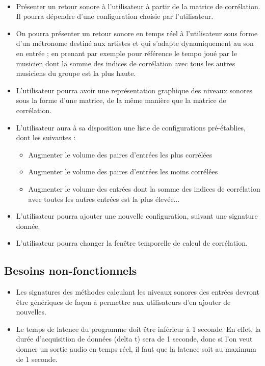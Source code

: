 \documentclass{article}
\begin{document}
    \paragraph{}
    \begin{itemize}
      \item Présenter un retour sonore à l'utilisateur à partir de la matrice de 
      corrélation. Il pourra dépendre d'une configuration choisie par l'utilisateur.
      \item On pourra présenter un retour sonore en temps réel à l'utilisateur sous
      forme d'un métronome destiné aux artistes et qui s'adapte dynamiquement au son
      en entrée ; en prenant par exemple pour référence le tempo joué par le musicien
      dont la somme des indices de corrélation avec tous les autres musiciens du groupe
      est la plus haute.
      \item L'utilisateur pourra avoir une représentation graphique des niveaux
      sonores sous la forme d'une matrice, de la même manière que la matrice de
      corrélation.
      \item L'utilisateur aura à sa disposition une liste de configurations
      pré-établies, dont les suivantes :
      \begin{itemize}
        \item Augmenter le volume des paires d'entrées les plus corrélées
        \item Augmenter le volume des paires d'entrées les moins corrélées
        \item Augmenter le volume des entrées dont la somme des indices de
        corrélation avec toutes les autres entrées est la plus élevée...
      \end{itemize}
      \item L'utilisateur pourra ajouter une nouvelle configuration, suivant
      une signature donnée.
      \item L'utilisateur pourra changer la fenêtre temporelle de calcul de
      corrélation.
    \end{itemize}
    \subsection{Besoins non-fonctionnels}
    \begin{itemize}
      \item Les signatures des méthodes calculant les niveaux sonores des
      entrées devront être génériques de façon à permettre aux utilisateurs d'en
      ajouter de nouvelles.
      \item Le temps de latence du programme doit être inférieur à 1 seconde.
      En effet, la durée d'acquisition de données (delta t) sera de 1 seconde,
      donc si l'on veut donner un sortie audio en temps réel, il faut que la latence
      soit au maximum de 1 seconde.
    \end{itemize}
\end{document}
